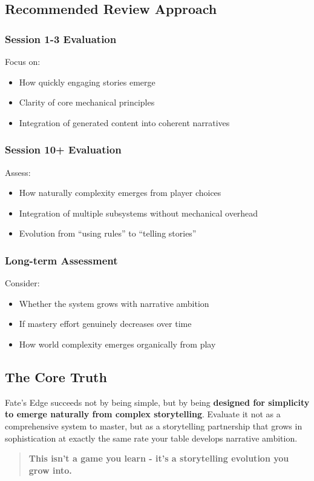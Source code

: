 \subsection{Recommended Review Approach}

\subsubsection{Session 1-3 Evaluation}
Focus on:
\begin{itemize}
    \item How quickly engaging stories emerge
    \item Clarity of core mechanical principles
    \item Integration of generated content into coherent narratives
\end{itemize}

\subsubsection{Session 10+ Evaluation}  
Assess:
\begin{itemize}
    \item How naturally complexity emerges from player choices
    \item Integration of multiple subsystems without mechanical overhead
    \item Evolution from ``using rules'' to ``telling stories''
\end{itemize}

\subsubsection{Long-term Assessment}
Consider:
\begin{itemize}
    \item Whether the system grows with narrative ambition
    \item If mastery effort genuinely decreases over time
    \item How world complexity emerges organically from play
\end{itemize}

\subsection{The Core Truth}

Fate's Edge succeeds not by being simple, but by being \textbf{designed for simplicity to emerge naturally from complex storytelling}. Evaluate it not as a comprehensive system to master, but as a storytelling partnership that grows in sophistication at exactly the same rate your table develops narrative ambition.

\begin{quote}
\textbf{This isn't a game you learn - it's a storytelling evolution you grow into.}
\end{quote}

